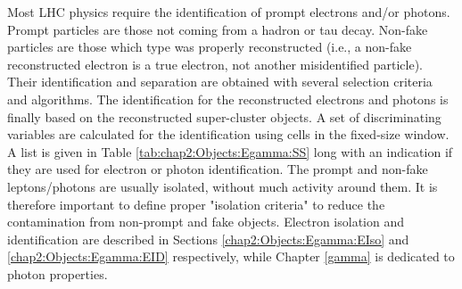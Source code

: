 Most LHC physics require the identification of prompt electrons and/or photons. Prompt particles are those not coming from a hadron or tau decay. Non-fake particles are those which type was properly reconstructed (i.e., a non-fake reconstructed electron is a true electron, not another misidentified particle). Their identification and separation are obtained with several selection criteria and algorithms. The identification for the reconstructed electrons and photons is finally based on the reconstructed super-cluster objects. A set of discriminating variables are calculated for the identification using cells in the fixed-size window. A list is given in Table \ref{tab:chap2:Objects:Egamma:SS} long with an indication if they are used for electron or photon identification. The prompt and non-fake leptons/photons are usually isolated, without much activity around them. It is therefore important to define proper "isolation criteria" to reduce the contamination from non-prompt and fake objects. Electron isolation and identification are described in Sections \ref{chap2:Objects:Egamma:EIso} and \ref{chap2:Objects:Egamma:EID} respectively, while Chapter \ref{gamma} is dedicated to photon properties.
